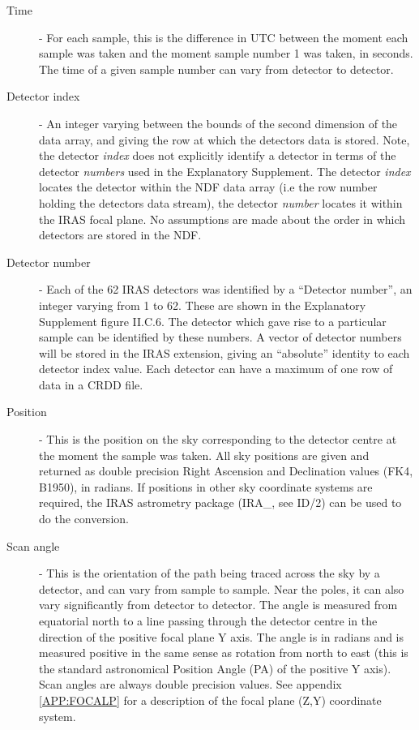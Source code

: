\begin{description}
\item [Time] - For each sample, this is the difference in UTC between the moment
each sample was taken and the moment sample number 1 was taken, in seconds.
The time of a given sample number can vary from detector to detector.

\item [Detector index] - An integer varying between the bounds of the second
dimension of the data array, and giving the row at which the detectors data
is stored. Note, the detector {\em index } does not explicitly 
identify a detector in terms of the detector {\em numbers } used in the 
Explanatory Supplement. The detector {\em index } locates the detector
within the NDF data array (i.e the row number holding the detectors data 
stream), the detector {\em number} locates it within the IRAS focal plane.
No assumptions are made about the order in which detectors are stored in the
NDF.

\item [Detector number] - Each of the 62 IRAS detectors was identified by a 
``Detector number'', an integer varying from 1 to 62. These are shown in the 
Explanatory Supplement figure II.C.6. The detector which gave rise to a
particular sample can be identified by these numbers. A vector of
detector numbers will be stored in the IRAS extension, giving an ``absolute''
identity to each detector index value. Each detector can have a maximum of 
one row of data in a CRDD file.

\item [Position] - This is the position on the sky corresponding to the detector
centre at the moment the sample was taken. All sky positions are given and
returned as double precision Right Ascension and Declination values (FK4,
B1950), in radians. If positions in other sky coordinate systems are required,
the IRAS astrometry package (IRA\_, see ID/2) can be used to do the conversion. 

\item [Scan angle] - This is the orientation of the path being traced across the
sky by a detector, and can vary from sample to sample. Near the poles, it can
also vary significantly from detector to detector. The angle is measured from
equatorial north to a line passing through the detector centre in the direction
of the positive focal plane Y axis. The angle is in radians and is measured
positive in the same sense as rotation from north to east (this is the standard
astronomical Position Angle (PA) of the positive Y axis). Scan angles are always
double precision values. See appendix \ref {APP:FOCALP} for a description of the
focal plane (Z,Y) coordinate system. 


\end{description}
